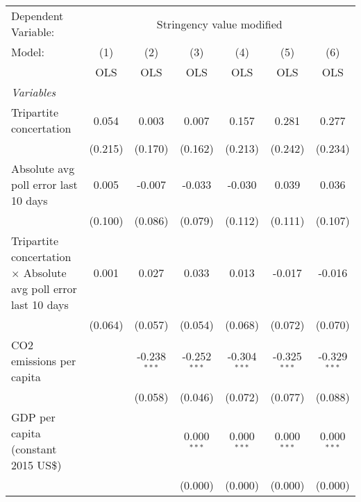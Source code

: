 
\begingroup
\centering
\begin{tabular}{lcccccc}
   \toprule
   Dependent Variable: & \multicolumn{6}{c}{Stringency value modified}\\
   Model:                                                                 & (1)     & (2)            & (3)            & (4)            & (5)            & (6)\\  
                                                                          &  OLS    & OLS            & OLS            & OLS            & OLS            & OLS\\  
   \midrule
   \emph{Variables}\\
   Tripartite concertation                                                & 0.054   & 0.003          & 0.007          & 0.157          & 0.281          & 0.277\\   
                                                                          & (0.215) & (0.170)        & (0.162)        & (0.213)        & (0.242)        & (0.234)\\   
   Absolute avg poll error last 10 days                                   & 0.005   & -0.007         & -0.033         & -0.030         & 0.039          & 0.036\\   
                                                                          & (0.100) & (0.086)        & (0.079)        & (0.112)        & (0.111)        & (0.107)\\   
   Tripartite concertation $\times$ Absolute avg poll error last 10 days  & 0.001   & 0.027          & 0.033          & 0.013          & -0.017         & -0.016\\   
                                                                          & (0.064) & (0.057)        & (0.054)        & (0.068)        & (0.072)        & (0.070)\\   
   CO2 emissions per capita                                               &         & -0.238$^{***}$ & -0.252$^{***}$ & -0.304$^{***}$ & -0.325$^{***}$ & -0.329$^{***}$\\   
                                                                          &         & (0.058)        & (0.046)        & (0.072)        & (0.077)        & (0.088)\\   
   GDP per capita (constant 2015 US\$)                                    &         &                & 0.000$^{***}$  & 0.000$^{***}$  & 0.000$^{***}$  & 0.000$^{***}$\\   
                                                                          &         &                & (0.000)        & (0.000)        & (0.000)        & (0.000)\\   

\end{tabular}
